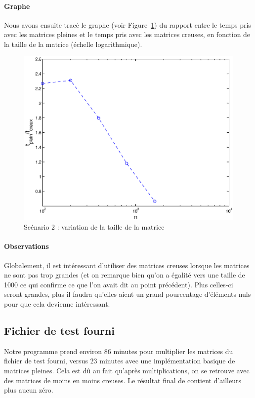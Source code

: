 \documentclass[12pt,a4paper]{article}
\begin{document}
\paragraph{Graphe}
Nous avons ensuite tracé le graphe (voir Figure~\ref{vtm}) du rapport entre le temps pris avec les matrices pleines et le temps pris avec les matrices creuses, en fonction de la taille de la matrice (échelle logarithmique).
\begin{figure}[!h]
	\begin{center}
		\includegraphics[width=15cm]{pourccst.eps}
		\caption{Scénario 2 : variation de la taille de la matrice}
		\label{vtm}
	\end{center}
\end{figure}

\paragraph{Observations}
Globalement, il est intéressant d'utiliser des matrices creuses lorsque les matrices ne sont pas trop grandes (et on remarque bien qu'on a égalité vers une taille de 1000 ce qui confirme ce que l'on avait dit au point précédent). Plus celles-ci seront grandes, plus il faudra qu'elles aient un grand pourcentage d'éléments nuls pour que cela devienne intéressant. 

\subsection{Fichier de test fourni}
Notre programme prend environ $86$ minutes pour multiplier les matrices du fichier de test fourni, versus $23$ minutes avec une implémentation basique de matrices pleines. Cela est dû au fait qu'après multiplications, on se retrouve avec des matrices de moins en moins creuses. Le résultat final de contient d'ailleurs plus aucun zéro.
\end{document}
